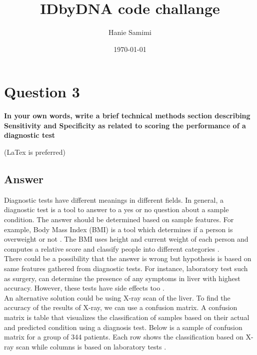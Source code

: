 \documentclass[12pt]{article}
\title{IDbyDNA code challange} %
\author{Hanie Samimi}%
\date{\today} %
\begin{document}
\setlength{\droptitle}{-5em}    
\maketitle


\section*{Question 3}
{\bfseries In your own words, write a brief technical methods section describing Sensitivity and Specificity as related to scoring the performance of a diagnostic test}

(LaTex is preferred)
\subsection*{Answer}
Diagnostic tests have different meanings in different fields. In general, a diagnostic test is
a tool to answer to a yes or no question about a sample condition. The answer should be determined based on sample features. For example, Body Mass Index (BMI) is a tool which determines if a person is overweight or not \cite{BMI}. The BMI uses height and current weight of each person and computes a relative score and classify people into different categories .\\

There could be a possibility that the answer is wrong but hypothesis is based on same features gathered from diagnostic tests. For instance, laboratory test such as surgery, can determine the presence of any symptoms in liver with highest accuracy. However, these tests have side effects too \cite{biopsy}.\\

An alternative solution could be using X-ray scan of the liver. To find the accuracy of the results of X-ray, we can use a confusion matrix. A confusion matrix is table that visualizes the classification of samples based on their actual and predicted condition using a diagnosis test\cite{CFT}. Below is a sample of confusion matrix for a group of 344 patients. Each row shows the classification based on X-ray scan while columns is based on laboratory tests \cite{table}.\\
\end{document}
